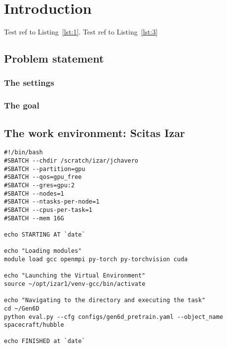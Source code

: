 
\chapter{Introduction}\label{chapter:introduction}
Test ref to Listing~\ref{lst:1}. Test ref to Listing~\ref{lst:3}
\section{Problem statement}
\subsection{The settings}
\subsection{The goal}
\section{The work environment: Scitas Izar}

\begin{lstlisting}[style=bashstyle, caption={Bash script \texttt{execute.sh} to run a machine learning model on Scitas Izar EPFL. This script is specific to Gen6D's architecture, further discussed later.}]
#!/bin/bash
#SBATCH --chdir /scratch/izar/jchavero
#SBATCH --partition=gpu
#SBATCH --qos=gpu_free
#SBATCH --gres=gpu:2
#SBATCH --nodes=1
#SBATCH --ntasks-per-node=1
#SBATCH --cpus-per-task=1
#SBATCH --mem 16G

echo STARTING AT `date`

echo "Loading modules"
module load gcc openmpi py-torch py-torchvision cuda

echo "Launching the Virtual Environment"
source ~/opt/izar1/venv-gcc/bin/activate

echo "Navigating to the directory and executing the task"
cd ~/Gen6D                                    
python eval.py --cfg configs/gen6d_pretrain.yaml --object_name spacecraft/hubble

echo FINISHED at `date`
\end{lstlisting}